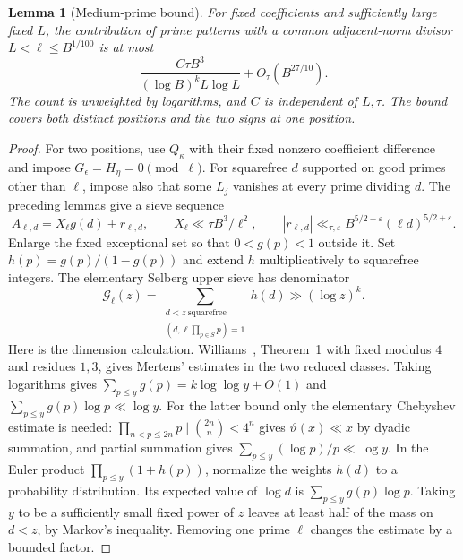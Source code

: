 \documentclass[11pt]{article}
\newtheorem{lemma}[theorem]{Lemma}
\theoremstyle{definition}
\theoremstyle{remark}
\begin{document}
\begin{lemma}[Medium-prime bound]\label{lem:v5-medium-sieve}
For fixed coefficients and sufficiently large fixed $L$, the contribution
of prime patterns with a common adjacent-norm divisor
$L<\ell\leq B^{1/100}$ is at most
\begin{equation}\label{eq:v5-medium-sieve}
 \frac{C\tau B^3}{(\log B)^k L\log L}+O_\tau(B^{27/10}).
\end{equation}
The count is unweighted by logarithms, and $C$ is independent of $L,\tau$.
The bound covers both distinct positions and the two signs at one position.
\end{lemma}
\begin{proof}
For two positions, use $Q_\kappa$ with their fixed nonzero coefficient
difference and impose $G_\epsilon=H_\eta=0\pmod\ell$.
For squarefree $d$ supported on good primes other than $\ell$, impose also
that some $L_j$ vanishes at every prime dividing $d$. The preceding lemmas
give a sieve sequence
\[
 A_{\ell,d}=X_\ell g(d)+r_{\ell,d},\qquad
 X_\ell\ll\tau B^3/\ell^2,\qquad
 |r_{\ell,d}|\ll_{\tau,\varepsilon}
 B^{5/2+\varepsilon}(\ell d)^{5/2+\varepsilon}.
\]
Enlarge the fixed exceptional set so that $0<g(p)<1$ outside it.
Set $h(p)=g(p)/(1-g(p))$ and extend $h$ multiplicatively to squarefree
integers. The elementary Selberg upper sieve has denominator
\[
 \mathcal G_\ell(z)=\sum_{\substack{d<z\ \text{squarefree}\\
                         (d,\ell\prod_{p\in S}p)=1}}h(d)
 \gg (\log z)^k.
\]
Here is the dimension calculation. Williams~\cite{v5williams}, Theorem~1
with fixed modulus $4$ and residues $1,3$, gives Mertens' estimates in the
two reduced classes. Taking logarithms gives
$\sum_{p\leq y}g(p)=k\log\log y+O(1)$ and
$\sum_{p\leq y}g(p)\log p\ll\log y$.
For the latter bound only the elementary Chebyshev estimate is needed:
$\prod_{n<p\leq2n}p\mid\binom{2n}{n}<4^n$ gives
$\vartheta(x)\ll x$ by dyadic summation, and partial summation gives
$\sum_{p\leq y}(\log p)/p\ll\log y$.
In the Euler product $\prod_{p\leq y}(1+h(p))$, normalize the weights
$h(d)$ to a probability distribution. Its expected value of $\log d$ is
$\sum_{p\leq y}g(p)\log p$. Taking $y$ to be a sufficiently small fixed
power of $z$ leaves at least half of the mass on $d<z$, by Markov's
inequality. Removing one prime $\ell$ changes the estimate by a bounded
factor.


\end{proof}
\end{document}
